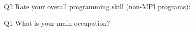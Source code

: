 \begin{description}%
\item{Q2} Rate your overall programming skill (non-MPI programs):%
\item{Q1} What is your main occupation?%
\end{description}%

